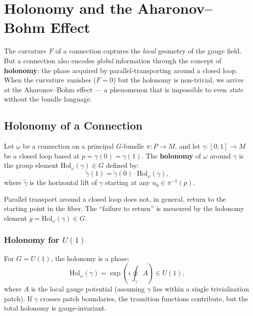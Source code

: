\chapter{Holonomy and the Aharonov--Bohm Effect}

The curvature $F$ of a connection captures the \emph{local} geometry of the gauge field. But a connection also encodes \emph{global} information through the concept of \textbf{holonomy}: the phase acquired by parallel-transporting around a closed loop. When the curvature vanishes ($F = 0$) but the holonomy is non-trivial, we arrive at the Aharonov--Bohm effect --- a phenomenon that is impossible to even \emph{state} without the bundle language.

\section{Holonomy of a Connection}

\begin{definition}[Holonomy]
Let $\omega$ be a connection on a principal $G$-bundle $\pi: P \to M$, and let $\gamma: [0,1] \to M$ be a closed loop based at $p = \gamma(0) = \gamma(1)$. The \textbf{holonomy} of $\omega$ around $\gamma$ is the group element $\mathrm{Hol}_\omega(\gamma) \in G$ defined by:
\begin{equation}
\tilde{\gamma}(1) = \tilde{\gamma}(0) \cdot \mathrm{Hol}_\omega(\gamma),
\end{equation}
where $\tilde{\gamma}$ is the horizontal lift of $\gamma$ starting at any $u_0 \in \pi^{-1}(p)$.
\end{definition}

Parallel transport around a closed loop does not, in general, return to the starting point in the fiber. The ``failure to return'' is measured by the holonomy element $g = \mathrm{Hol}_\omega(\gamma) \in G$.

\subsection{Holonomy for $U(1)$}

For $G = U(1)$, the holonomy is a phase:
\begin{equation}
\mathrm{Hol}_\omega(\gamma) = \exp\!\left(i\oint_\gamma A\right) \in U(1),
\end{equation}
where $A$ is the local gauge potential (assuming $\gamma$ lies within a single trivialisation patch). If $\gamma$ crosses patch boundaries, the transition functions contribute, but the total holonomy is gauge-invariant.

